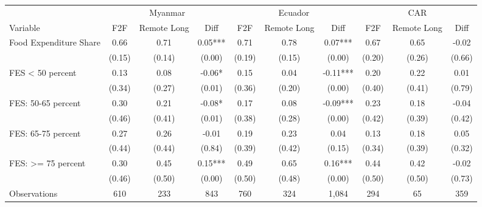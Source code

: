 \begin{tabular}{l*{9}c}
\hline\hline
 & \multicolumn{3}{c}{Myanmar} & \multicolumn{3}{c}{Ecuador} & \multicolumn{3}{c}{CAR}\\ 
Variable & F2F & Remote Long & Diff & F2F & Remote Long & Diff & F2F & Remote Long & Diff \\
\hline
Food Expenditure Share&0.66&0.71&0.05***&0.71&0.78&0.07***&0.67&0.65&-0.02\\
&(0.15)&(0.14)&(0.00)&(0.19)&(0.15)&(0.00)&(0.20)&(0.26)&(0.66)\\
FES < 50 percent&0.13&0.08&-0.06*&0.15&0.04&-0.11***&0.20&0.22&0.01\\
&(0.34)&(0.27)&(0.01)&(0.36)&(0.20)&(0.00)&(0.40)&(0.41)&(0.79)\\
FES: 50-65 percent&0.30&0.21&-0.08*&0.17&0.08&-0.09***&0.23&0.18&-0.04\\
&(0.46)&(0.41)&(0.01)&(0.38)&(0.28)&(0.00)&(0.42)&(0.39)&(0.42)\\
FES: 65-75 percent&0.27&0.26&-0.01&0.19&0.23&0.04&0.13&0.18&0.05\\
&(0.44)&(0.44)&(0.84)&(0.39)&(0.42)&(0.15)&(0.34)&(0.39)&(0.32)\\
FES: >= 75 percent&0.30&0.45&0.15***&0.49&0.65&0.16***&0.44&0.42&-0.02\\
&(0.46)&(0.50)&(0.00)&(0.50)&(0.48)&(0.00)&(0.50)&(0.50)&(0.73)\\
\hline
Observations & 610 & 233 & 843 & 760 & 324 & 1,084 & 294 & 65 & 359 \\
\hline\hline
\end{tabular}
